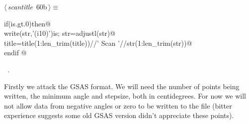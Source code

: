 \documentclass[10pt,a4paper,notitlepage]{article}
\begin{document}
\begin{flushleft} \small
\begin{minipage}{\linewidth}\label{scrap65}\raggedright\small
{} $\langle\,${\it scantitle}\nobreak\ {\footnotesize {60b}}$\,\rangle\equiv$
\vspace{-1ex}
\begin{list}{}{} \item
\mbox{}\verb@      if(is.gt.0)then@\\
\mbox{}\verb@       write(str,'(i10)')is; str=adjustl(str)@\\
\mbox{}\verb@       title=title(1:len_trim(title))//' Scan '//str(1:len_trim(str))@\\
\mbox{}\verb@      endif                                                                  @{\NWsep}
\end{list}
\vspace{-1.5ex}
\footnotesize
\begin{list}{}{\setlength{\itemsep}{-\parsep}\setlength{\itemindent}{-\leftmargin}}
\item \NWtxtMacroRefIn\ .

\item{}
\end{list}
\end{minipage}\vspace{4ex}
\end{flushleft}
Firstly we attack the GSAS format. 
We will need the number of points being written, the minimum angle
and stepsize, both in centidegrees.
For now we will not allow data from negative angles or zero to be written
to the file (bitter experience suggests some old GSAS version didn't
appreciate these points).
\end{document}

